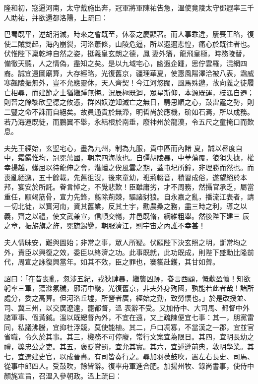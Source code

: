 \begin{pinyinscope}
 隆和初，寇逼河南，太守戴施出奔，冠軍將軍陳祐告急，溫使竟陵太守鄧遐率三千人助祐，并欲還都洛陽，上疏曰：



 巴蜀既平，逆胡消滅，時來之會既至，休泰之慶顯著。而人事乖違，屢喪王略，復使二賊雙起，海內崩裂，河洛蕭條，山陵危逼，所以遐邇悲惶，痛心於既往者也。伏惟陛下稟乾坤自然之姿，挺羲皇玄朗之德，鳳妻外籓，龍飛皇極，時務陵替，備徹天聽，人之情偽，盡知之矣。是以九域宅心，幽遐企踵，思佇雲羅，混網四
 裔。誠宜遠圖廟算，大存經略，光復舊京，疆理華夏，使惠風陽澤洽被八表，霜威寒飆陵振無外，豈不允應靈休，天人齊契！今江河悠闊，風馬殊邈，故向義之徒履亡相尋，而建節之士猶繼踵無悔。況辰極既迴，眾星斯仰，本源既運，枝泒自遷；則晉之餘黎欣皇德之攸憑，群凶妖逆知滅亡之無日，騁思順之心，鼓雷霆之勢，則二豎之命不誅而自絕矣。故員通貴於無滯，明哲尚於應機，砎如石焉，所以成務。若乃海運既徒，而鵬翼不舉，永結根於南垂，廢神州於龍漠，令五尺之童掩口而歎息。



 夫先王經始，玄聖宅心，畫為九州，制為九服，貴中區而內諸
 夏，誠以晷度自中，霜露惟均，冠冕萬國，朝宗四海故也。自彊胡陵暴，中華蕩覆，狼狽失據，權幸揚越，蠖屈以待龍伸之會，潛蟠之俟風雲之期，蓋屯圮所鐘，非理勝而然也。而喪亂緬邈，五十餘載，先舊徂沒，後來童幼，班荊輟音，積習成俗，遂望絕於本邦，宴安於所託。眷言悼之，不覺悲歎！臣雖庸劣，才不周務，然攝官承乏，屬當重任，願竭筋骨，宣力先鋒，翦除荊棘，驅諸豺狼。自永嘉之亂，播流江表者，請一切北徙，以實河南，資其舊業，反其土宇，勸農桑之務，盡三時之利，導之以義，齊之以禮，使文武兼宣，信順交暢，井邑既脩，綱維粗舉。然後陛下建三
 辰之章，振旂旗之旌，冕旒錫鑾，朝服濟江，則宇宙之內誰不幸甚！



 夫人情昧安，難與圖始；非常之事，眾人所疑。伏願陛下決玄照之明，斷常均之外，責臣以興復之效，委臣以終濟之功。此事既就，此功既成，則陛下盛勳比隆前代，周宣之詠復興當年。如其不效，臣之罪也，褰裳赴鑊，其甘如薺。



 詔曰：「在昔喪亂，忽涉五紀，戎狄肆暴，繼襲凶跡，眷言西顧，慨歎盈懷！知欲躬率三軍，蕩滌氛穢，廓清中畿，光復舊京，非夫外身殉國，孰能若此者哉！諸所處分，委之高算。但河洛丘墟，所營者廣，經始之勤，致勞懷也。」於是改授並、司、冀三州，以交廣遼遠，罷都督，溫
 表辭不受。又加侍中、大司馬、都督中外諸軍事、假黃鉞。溫以既總督內外，不宜在遠，又上疏陳便宜七事：其一，朋黨雷同，私議沸騰，宜抑杜浮競，莫使能植。其二，戶口凋寡，不當漢之一郡，宜並官省職，令久於其事。其三，機務不可停廢，常行文案宜為限日。其四，宜明長幼之禮，獎忠公之吏。其五，褒貶賞罰，宜允其實。其六，宜述遵前典，敦明學業。其七，宜選建史官，以成晉書。有司皆奏行之。尋加羽葆鼓吹，置左右長史、司馬、從事中郎四人。受鼓吹，餘皆辭。復率舟軍進合肥。加揚州牧、錄尚書事，使侍中顏旄宣旨，召溫入參朝政。溫上疏曰：




\end{pinyinscope}
